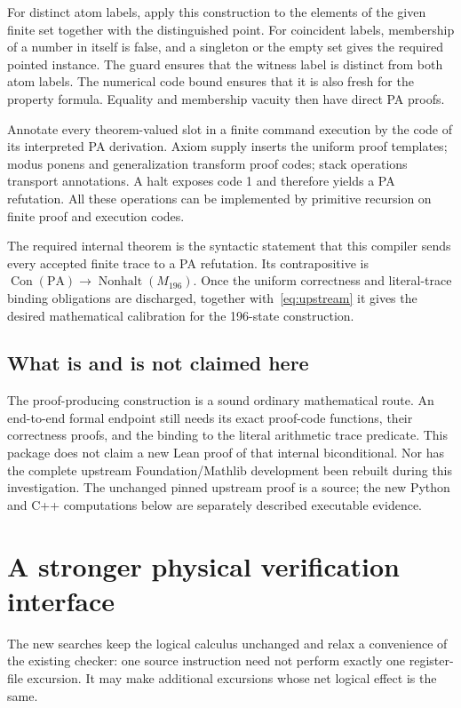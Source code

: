 \documentclass[11pt,letterpaper]{article}
\newcommand{\PA}{\mathrm{PA}}
\newcommand{\Con}{\operatorname{Con}}
\newcommand{\NH}{\operatorname{Nonhalt}}
\begin{document}
For distinct atom labels, apply this construction to the elements of
the given finite set together with the distinguished point. For coincident
labels, membership of a number in itself is false, and a singleton or
the empty set gives the required pointed instance. The guard ensures
that the witness label is distinct from both atom labels. The numerical
code bound ensures that it is also fresh for the property formula.
Equality and membership vacuity then have direct PA proofs.

Annotate every theorem-valued slot in a finite command execution by the
code of its interpreted PA derivation. Axiom supply inserts the uniform
proof templates; modus ponens and generalization transform proof codes;
stack operations transport annotations. A halt exposes code 1 and
therefore yields a PA refutation. All these operations can be implemented
by primitive recursion on finite proof and execution codes.

The required internal theorem is the syntactic statement that this
compiler sends every accepted finite trace to a PA refutation. Its
contrapositive is $\Con(\PA)\to\NH(M_{196})$. Once the uniform
correctness and literal-trace binding obligations are discharged,
together with~\eqref{eq:upstream} it gives the desired mathematical
calibration for the 196-state construction.

\subsection{What is and is not claimed here}

The proof-producing construction is a sound ordinary mathematical route.
An end-to-end formal endpoint still needs its exact proof-code functions,
their correctness proofs, and the binding to the literal arithmetic trace
predicate. This package does not claim a new Lean proof of that internal
biconditional. Nor has the complete upstream Foundation/Mathlib
development been rebuilt during this investigation. The unchanged pinned
upstream proof is a source; the new Python and C++ computations below are
separately described executable evidence.

\section{A stronger physical verification interface}
\label{sec:physical}

The new searches keep the logical calculus unchanged and relax a
convenience of the existing checker: one source instruction need not
perform exactly one register-file excursion. It may make additional
excursions whose net logical effect is the same.
\end{document}
